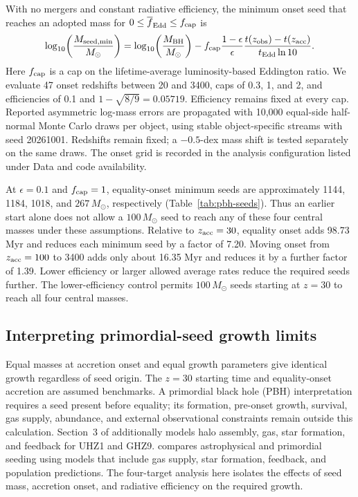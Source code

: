 \documentclass[pdflatex,sn-basic]{sn-jnl}
\newcommand{\mbh}{M_{\mathrm{BH}}}
\begin{document}
With no mergers and constant radiative efficiency, the minimum onset seed
that reaches an adopted mass for $0\leq\overline{f}_{\mathrm{Edd}}\leq f_{\rm cap}$ is
\begin{equation}
\log_{10}\!\left(\frac{M_{\rm seed,min}}{M_\odot}\right)
=\log_{10}\!\left(\frac{\mbh}{M_\odot}\right)
-f_{\rm cap}\frac{1-\epsilon}{\epsilon}
\frac{t(z_{\rm obs})-t(z_{\rm acc})}{t_{\rm Edd}\ln 10}.
\label{eq:pbh-minimum-seed}
\end{equation}
Here $f_{\rm cap}$ is a cap on the lifetime-average luminosity-based Eddington
ratio. We evaluate 47 onset redshifts between
20 and 3400, caps of 0.3, 1, and 2, and efficiencies of 0.1 and
$1-\sqrt{8/9}=0.05719$. Efficiency remains fixed at every cap.
Reported asymmetric log-mass
errors are propagated with 10,000 equal-side half-normal Monte Carlo draws
per object, using stable object-specific streams with seed 20261001.
Redshifts remain fixed; a $-0.5$-dex mass shift is tested separately on the
same draws. The onset grid is recorded in the analysis configuration
listed under Data and code availability.






At $\epsilon=0.1$ and $f_{\rm cap}=1$, equality-onset minimum seeds are
approximately 1144, 1184, 1018, and $267\,M_\odot$, respectively
(Table~\ref{tab:pbh-seeds}). Thus an earlier start alone does not allow a
$100\,M_\odot$ seed to reach any of these four central masses under these
assumptions. Relative to $z_{\rm acc}=30$, equality onset adds 98.73 Myr
and reduces each minimum seed by a factor of 7.20. Moving onset from
$z_{\rm acc}=100$ to 3400 adds only about 16.35 Myr and reduces it by a
further factor of 1.39. Lower efficiency or larger allowed average rates
reduce the required seeds further. The lower-efficiency control permits
$100\,M_\odot$ seeds starting at $z=30$ to reach all four central masses.
\FloatBarrier

\subsection{Interpreting primordial-seed growth limits}

Equal masses at accretion onset and equal growth parameters give identical
growth regardless of seed origin. The $z=30$ starting time and equality-onset
accretion are assumed benchmarks. A primordial black hole (PBH) interpretation
requires a seed present before equality; its formation, pre-onset growth,
survival, gas supply, abundance, and external observational constraints remain
outside this calculation. Section~3 of \citet{dayal2024} additionally models
halo assembly, gas, star formation, and feedback for UHZ1 and GHZ9.
\citet{dayal2026} compares astrophysical and primordial seeding using models
that include gas supply, star formation, feedback, and population predictions.
The four-target analysis here isolates the effects of seed mass, accretion
onset, and radiative efficiency on the required growth.
\end{document}
